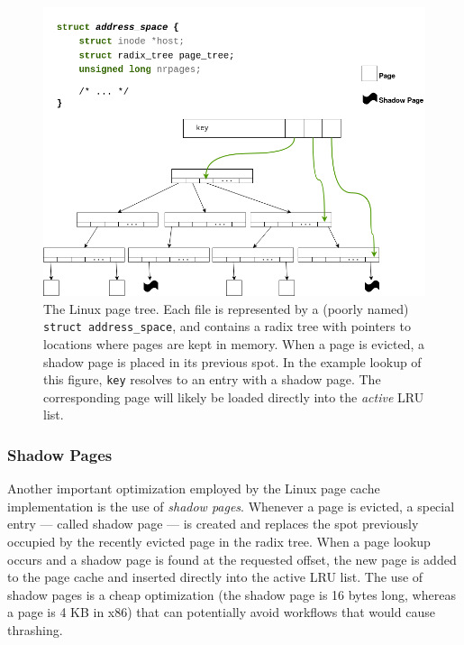 \begin{figure}[h]
  \includegraphics[scale=0.3]{img/LinuxRadixTree.png}
  \caption{The Linux page tree. Each file is represented by a (poorly named)
  \texttt{struct address\_space}, and contains a radix tree with pointers to
  locations where pages are kept in memory. When a page is evicted, a shadow
  page is placed in its previous spot. In the example lookup of this figure,
  \texttt{key} resolves to an entry with a shadow page. The corresponding page
  will likely be loaded directly into the \emph{active} LRU list.}
  \label{fig:radix}
\end{figure}

\subsubsection{Shadow Pages}

Another important optimization employed by the Linux page cache implementation
is the use of \emph{shadow pages}. Whenever a page is evicted, a special entry
--- called shadow page --- is created and replaces the spot previously occupied
by the recently evicted page in the radix tree. When a page lookup occurs and a
shadow page is found at the requested offset, the new page is added to the page
cache and inserted directly into the active LRU list. The use of shadow pages
is a cheap optimization (the shadow page is 16 bytes long, whereas a page is 4 KB
in x86) that can potentially avoid workflows that would cause thrashing.
